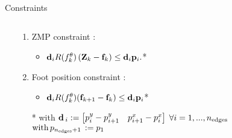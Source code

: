 \begin{frame}{Constraints}
\begin{columns}
    \begin{cadre}
      \begin{center}
        \scalebox{0.7}{}
      \end{center}               
    \end{cadre}
    \begin{cadre}
        \begin{enumerate}
            \item ZMP constraint :
                \begin{itemize}
                  \item $ {\bf d} _i R(f_k^\theta) \left( {\bf Z}_k -
                      {\bf f}_k \right) \leq {\bf d} _i {\bf p} _i. $*
                \end{itemize}
             \item Foot position constraint :
                \begin{itemize}
                  \item ${\bf d}_i R(f_k^\theta) ({\bf f}_{k+1} - {\bf f}_k )
                     \leq {\bf d}_i {\bf p}_i $*
                \end{itemize}
  
              \item[*] with $ {\bf d}\,_i :=
                  \begin{bmatrix}
                      p_{i}^y-p_{i+1}^y & p_{i+1}^{x}-p_{i}^{x}
                  \end{bmatrix} $
                  $ \forall i = 1,...,n_\textup{edges} $\\
                      $ \text{with} \,p_{n_\textup{edges}+1}\,:=p_1 $
            \end{enumerate}
        \end{cadre}
    \end{columns}
\end{frame}

